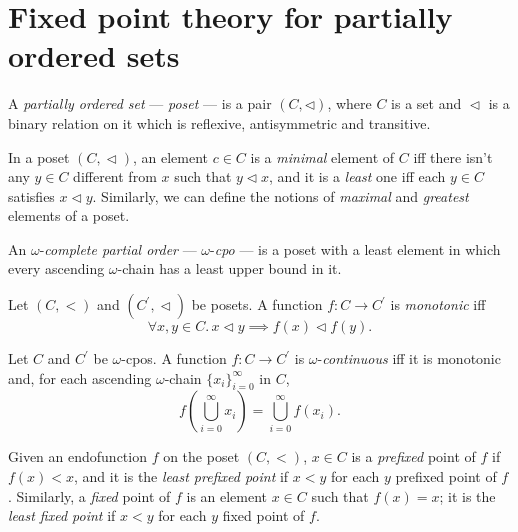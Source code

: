 \section{Fixed point theory for partially ordered sets}

\begin{dfn}
  A \emph{partially ordered set} --- \emph{poset} --- is a pair
  \((C, \lhd)\), where \(C\) is a set and \({}\lhd{}\) is a binary relation
  on it which is reflexive, antisymmetric and transitive.
\end{dfn}

In a poset \((C, {}\lhd)\), an element \(c \in C\) is a \emph{minimal}
element of \(C\) iff there isn't any \(y \in C\) different from \(x\) such
that \(y \lhd x\), and it is a \emph{least} one iff each \(y \in C\) satisfies
\(x \lhd y\).
Similarly, we can define the notions of \emph{maximal} and \emph{greatest}
elements of a poset.


\begin{dfn}
  An \(\omega{}\)-\emph{complete partial order} --- \(\omega{}\)-\emph{cpo} ---
  is a poset with a least element in which every ascending \(\omega{}\)-chain
  has a least upper bound in it.
\end{dfn}

\begin{dfn}
  Let \((C, {}<)\) and \((C^\prime, {}\lhd)\) be posets.
  A function \(f \colon C \to C^\prime\) is \emph{monotonic} iff
  \[
    \forall x,y \in C.\, x \lhd y \implies f(x) \lhd f(y).
  \]
\end{dfn}

\begin{dfn}
  Let \(C\) and \(C^\prime\) be \(\omega{}\)-cpos.
  A function \(f \colon C \to C^\prime\) is \(\omega{}\)-\emph{continuous}
  iff it is monotonic and, for each ascending \(\omega{}\)-chain
  \(\lbrace x_i \rbrace_{i=0}^\infty\) in \(C\),
  \[
  f\left(\bigcup_{i=0}^\infty x_i\right) = \bigcup_{i=0}^\infty f(x_i).
  \]
\end{dfn}

\begin{dfn}
  Given an endofunction \(f\) on the poset \((C,<)\), \(x \in C\) is a \emph{prefixed} point of \(f\) if \(f(x) < x\), and it is the \emph{least prefixed point} if \(x < y\) for each \(y\) prefixed point of \(f\).
  Similarly, a \emph{fixed} point of \(f\) is an element \(x \in C\) such that \(f(x) = x\); it is the \emph{least fixed point} if \(x < y\) for each \(y\) fixed point of \(f\).
\end{dfn}


